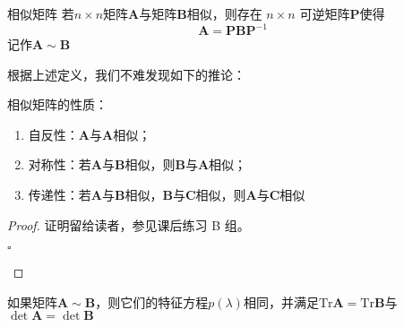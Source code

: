 \begin{definition}{相似矩阵}
	若$n\times n$矩阵$\mathbf{A}$与矩阵$\mathbf{B}$相似，则存在 $n\times n$ 可逆矩阵$\mathbf{P}$使得$$\mathbf{A}=\mathbf{P}\mathbf{B}\mathbf{P}^{-1}$$记作$\mathbf{A}\sim \mathbf{B}$
\end{definition}

根据上述定义，我们不难发现如下的推论：

\begin{corollary}
	相似矩阵的性质：
	\begin{enumerate}
		\item 自反性：$\mathbf{A}$与$\mathbf{A}$相似；
		\item 对称性：若$\mathbf{A}$与$\mathbf{B}$相似，则$\mathbf{B}$与$\mathbf{A}$相似；
		\item 传递性：若$\mathbf{A}$与$\mathbf{B}$相似，$\mathbf{B}$与$\mathbf{C}$相似，则$\mathbf{A}$与$\mathbf{C}$相似
	\end{enumerate}
\end{corollary}

\begin{proof}
	证明留给读者，参见课后练习 B 组。
	\begin{flushright}
		$\square$
	\end{flushright}
\end{proof}

\begin{corollary}
	如果矩阵$\mathbf{A}\sim \mathbf{B}$，则它们的特征方程$p(\lambda)$相同，并满足$\text{Tr}\mathbf{A}=\text{Tr}\mathbf{B}$与$\det \mathbf{A}=\det \mathbf{B}$
\end{corollary}

